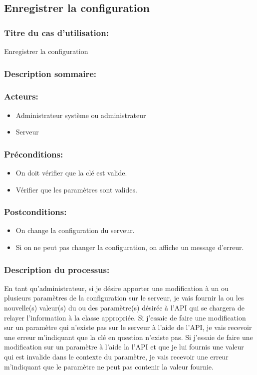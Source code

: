 \documentclass{scrreprt}
\begin{document}
\subsection{Enregistrer la configuration}
\subsubsection{Titre du cas d'utilisation:} Enregistrer la configuration
\subsubsection{Description sommaire:}
\subsubsection{Acteurs:}
\begin{itemize}
	\item Administrateur système ou administrateur
    \item Serveur
\end{itemize}
\subsubsection{Préconditions:}
\begin{itemize}
    \item On doit vérifier que la clé est valide.
    \item Vérifier que les paramètres sont valides.
\end{itemize} 
\subsubsection{Postconditions:}
\begin{itemize}
    \item On change la configuration du serveur.
    \item Si on ne peut pas changer la configuration, on affiche un message d'erreur.
\end{itemize} 
\subsubsection{Description du processus:}En tant qu'administrateur, si je désire apporter une modification à un ou plusieurs
paramètres de la configuration sur le serveur, je vais fournir la ou les nouvelle(s) valeur(s)
du ou des paramètre(s) désirée à l'API qui se chargera de relayer l'information à la classe appropriée.
Si j'essaie de faire une modification sur un paramètre qui n'existe pas sur le
serveur à l'aide de l'API, je vais recevoir une erreur m'indiquant que la clé en
question n'existe pas.
Si j'essaie de faire une modification sur un paramètre à l'aide la l'API et que
je lui fournis une valeur qui est invalide dans le contexte du paramètre, je
vais recevoir une erreur m'indiquant que le paramètre ne peut pas contenir
la valeur fournie.
\end{document}

